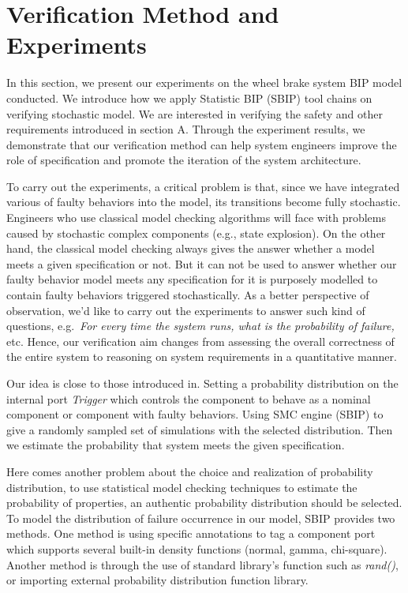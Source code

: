 

\section{Verification Method and Experiments}

In this section, we present our experiments on the wheel brake system BIP model conducted. We introduce how we apply Statistic BIP (SBIP) tool chains on verifying stochastic model. We are interested in verifying the safety and other requirements introduced in section A. Through the experiment results, we demonstrate that our verification method can help system engineers improve the role of specification and promote the iteration of the system architecture.

To carry out the experiments, a critical problem is that, since we have integrated various of faulty behaviors into the model, its transitions become fully stochastic. Engineers who use classical model checking algorithms will face with problems caused by stochastic complex components (e.g., state explosion). On the other hand, the classical model checking always gives the answer whether a model meets a given specification or not. But it can not be used to answer whether our faulty behavior model meets any specification for it is purposely modelled to contain faulty behaviors triggered stochastically. As a better perspective of observation, we'd like to carry out the experiments to answer such kind of questions, e.g.\ \emph{For every time the system runs, what is the probability of failure,} etc. Hence, our verification aim changes from assessing the overall correctness of the entire system to reasoning on system requirements in a quantitative manner.

Our idea is close to those introduced in\cite{smc10,smc10'}. Setting a probability distribution on the internal port \emph{Trigger} which controls the component to behave as a nominal component or component with faulty behaviors. Using SMC engine (SBIP) to give a randomly sampled set of simulations with the selected distribution. Then we estimate the probability that system meets the given specification. 

Here comes another problem about the choice and realization of probability distribution, to use statistical model checking techniques to estimate the probability of properties, an authentic probability distribution should be selected. To model the distribution of failure occurrence in our model, SBIP provides two methods. One method is using specific annotations to tag a component port which supports several built-in density functions (normal, gamma, chi-square). Another method is through the use of standard library's function such as \emph{rand()}, or importing external probability distribution function library.

